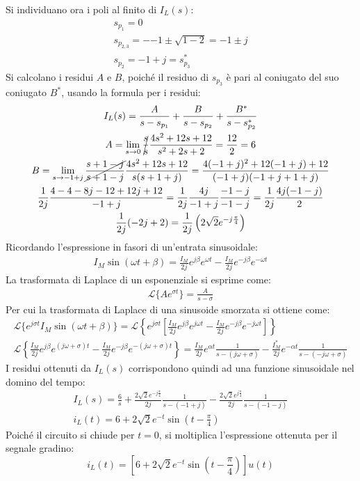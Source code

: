 \documentclass{article}
\begin{document}
Si individuano ora i poli al finito di $I_L(s)$:
\begin{gather*}
    s_{p_1}=0\\
    s_{p_{2,3}}=-{-1\pm\sqrt{1-2}}=-1\pm j\\
    s_{p_2}=-1+j=s_{p_3}^*
\end{gather*}
Si calcolano i residui $A$ e $B$, poiché il residuo di $s_{p_3}$ è pari al coniugato del suo coniugato $B^*$, usando la formula per i residui:
\begin{gather*}
    I_L(s)=\displaystyle\frac{A}{s-s_{p_1}}+\frac{B}{s-s_{p_2}}+\frac{B^*}{s-s_{p_2}^*}\\
    A=\lim_{s\to 0}\displaystyle\cancel{\frac{s}{s}}\frac{4s^2+12s+12}{s^2+2s+2}=\frac{12}{2}=6\\
    B=\lim_{s\to -1+j}\displaystyle\cancel{\frac{s+1-j}{s+1-j}}\frac{4s^2+12s+12}{s(s+1+j)}=\frac{4(-1+j)^2+12(-1+j)+12}{(-1+j)(-1+j+1+j)}\\
    \displaystyle\frac{1}{2j}\frac{4-4-8j-12+12j+12}{-1+j}=\frac{1}{2j}\frac{4j}{-1+j}\frac{-1-j}{-1-j}=\frac{1}{2j}\frac{4j(-1-j)}{2}\\    
    \displaystyle\frac{1}{2j}(-2j+2)=\frac{1}{2j}\left(2\sqrt{2}e^{-j\frac{\pi}{4}}\right)
\end{gather*}
Ricordando l'espressione in fasori di un'entrata sinusoidale:
\begin{gather*}
    I_M\sin(\omega t+\beta)=\displaystyle\frac{I_M}{2j}e^{j\beta}e^{\omega t}-\frac{I_M}{2j}e^{-j\beta}e^{-\omega t}
\end{gather*}
La trasformata di Laplace di un esponenziale si esprime come:
\begin{gather*}
    \mathcal{L}\{Ae^{\sigma t}\}=\displaystyle\frac{A}{s-\sigma}
\end{gather*}
Per cui la trasformata di Laplace di una sinusoide smorzata si ottiene come:
\begin{gather*}
    \mathcal{L}\{e^{j\sigma t}I_M\sin(\omega t+\beta)\}=\mathcal{L}\left\{e^{j\sigma t}\left[\displaystyle\frac{I_M}{2j}e^{j\beta}e^{j\omega t}-\frac{I_M}{2j}e^{-j\beta}e^{-j\omega t}\right]\right\}\\
    \mathcal{L}\left\{\displaystyle\frac{I_M}{2j}e^{j\beta}e^{(j\omega+\sigma) t}-\frac{I_M}{2j}e^{-j\beta}e^{-(j\omega+\sigma) t}\right\}=\frac{I_M}{2j}e^{\alpha t}\frac{1}{s-(j\omega +\sigma)}-\frac{I_M^*}{2j}e^{-\alpha t}\frac{1}{s-(-j\omega +\sigma)}
\end{gather*}
I residui ottenuti da $I_L(s)$ corrispondono quindi ad una funzione sinusoidale nel domino del tempo:
\begin{gather*}
    I_L(s)=\displaystyle\frac{6}{s}+\frac{2\sqrt{2}e^{-j\frac{\pi}{4}}}{2j}\frac{1}{s-(-1+j)}-\frac{2\sqrt{2}e^{j\frac{\pi}{4}}}{2j}\frac{1}{s-(-1-j)}\\
    i_L(t)=6+2\sqrt{2}e^{-t}\sin\left(t-\displaystyle\frac{\pi}{4}\right)
\end{gather*}
Poiché il circuito si chiude per $t=0$, si moltiplica l'espressione ottenuta per il segnale gradino:
\begin{equation}
    i_L(t)=\left[6+2\sqrt{2}e^{-t}\sin\left(t-\displaystyle\frac{\pi}{4}\right)\right]u(t)
\end{equation}
\end{document}
